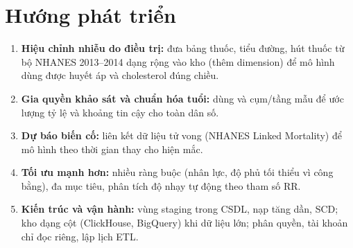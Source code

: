 \section{Hướng phát triển}
\begin{enumerate}
\item \textbf{Hiệu chỉnh nhiễu do điều trị:} đưa bảng thuốc, tiểu đường, hút thuốc từ bộ NHANES 2013--2014 dạng rộng vào kho (thêm dimension) để mô hình dùng được huyết áp và cholesterol đúng chiều.
\item \textbf{Gia quyền khảo sát và chuẩn hóa tuổi:} dùng  và cụm/tầng mẫu để ước lượng tỷ lệ và khoảng tin cậy cho toàn dân số.
\item \textbf{Dự báo biến cố:} liên kết dữ liệu tử vong (NHANES Linked Mortality) để mô hình theo thời gian thay cho hiện mắc.
\item \textbf{Tối ưu mạnh hơn:} nhiều ràng buộc (nhân lực, độ phủ tối thiểu vì công bằng), đa mục tiêu, phân tích độ nhạy tự động theo tham số RR.
\item \textbf{Kiến trúc và vận hành:} vùng staging trong CSDL, nạp tăng dần, SCD; kho dạng cột (ClickHouse, BigQuery) khi dữ liệu lớn; phân quyền, tài khoản chỉ đọc riêng, lập lịch ETL.
\end{enumerate}
